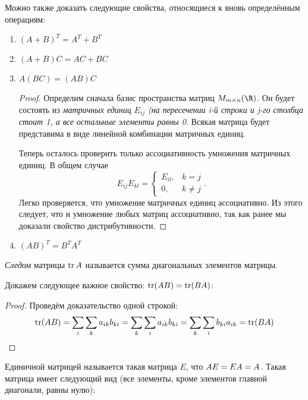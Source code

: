Можно также доказать следующие свойства, относящиеся к вновь определённым операциям:
\begin{enumerate}
\item $(A+B)^T = A^T+B^T$
\item $(A+B)C=AC+BC$
\item $A(BC)=(AB)C$
  \begin{proof}
    Определим сначала базис пространства матриц $M_{m\times
      n}(\R)$. Он будет состоять из \emph{матричных
      единиц} $E_{ij}$ \emph{(на
      пересечении i-й строки и j-го столбца стоит 1, а все
      остальные элементы равны 0}. Всякая матрица будет
    представима в виде линейной комбинации матричных единиц.
    
    Теперь осталось проверить только ассоциативность умножения
    матричных единиц. В общем
    случае 
    \begin{displaymath}
      E_{ij}E_{kl}=\left\{\begin{array}{ll}E_{il}, &   k=j\\0,&k\ne j\end{array}\right..
    \end{displaymath}
    Легко проверяется, что
    умножение матричных единиц ассоциативно. Из этого следует, что
    и умножение любых матриц ассоциативно, так как ранее мы
    доказали свойство дистрибутивности.
  \end{proof}
\item $(AB)^T=B^TA^T$
\end{enumerate}

\begin{df}
  \emph{Следом} матрицы $\operatorname{tr} A$ называется сумма диагональных элементов матрицы. 
\end{df}
  
Докажем следующее важное свойство: $\operatorname{tr}(AB)=\operatorname{tr}(BA)$:
\begin{proof}
  Проведём доказательство одной строкой:
  $$\operatorname{tr}(AB)=\sum_i\sum_k a_{ik}b_{ki}=\sum_k\sum_i a_{ik}b_{ki}=\sum_k\sum_i b_{ki}a_{ik}=\operatorname{tr}(BA)$$%
\end{proof}

\begin{df}
  Единичной матрицей называется такая матрица $E$, что $AE\bw=EA\bw=A$. Такая матрица имеет следующий вид (все элементы, кроме элементов главной диагонали, равны нулю):
  \begin{center}
    \scalebox{0.7}{
      $
        A =
        \begin{pmatrix}
          1&0&\dots&0\\
          0&1&\dots&0\\
          0&0&\ddots&\vdots\\
          0&0&\dots&1
        \end{pmatrix}
      $
    }
  \end{center}
\end{df}
  
